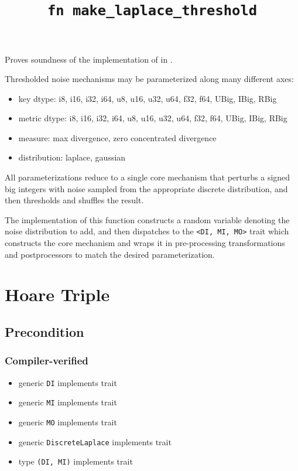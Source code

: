 \documentclass{article}
\title{\texttt{fn make\_laplace\_threshold}}
\author{\MichaelShoemateAuthor}
\date{}
\begin{document}
\maketitle

\contrib
Proves soundness of the implementation of  in .

Thresholded noise mechanisms may be parameterized along many different axes:
\begin{itemize}
    \item key dtype: i8, i16, i32, i64, u8, u16, u32, u64, f32, f64, UBig, IBig, RBig
    \item metric dtype: i8, i16, i32, i64, u8, u16, u32, u64, f32, f64, UBig, IBig, RBig
    \item measure: max divergence, zero concentrated divergence
    \item distribution: laplace, gaussian
\end{itemize}

All parameterizations reduce to a single core mechanism that perturbs
a signed big integers with noise sampled from the appropriate discrete distribution,
and then thresholds and shuffles the result.

The implementation of this function constructs a random variable denoting the noise distribution to add,
and then dispatches to the \texttt{<DI, MI, MO>} trait
which constructs the core mechanism and wraps it in pre-processing transformations and postprocessors to match the desired parameterization.

\section{Hoare Triple}
\subsection*{Precondition}
\subsubsection*{Compiler-verified}
\begin{itemize}
    \item generic \texttt{DI} implements trait 
    \item generic \texttt{MI} implements trait 
    \item generic \texttt{MO} implements trait 
    \item generic \texttt{DiscreteLaplace} implements trait 
    \item type \texttt{(DI, MI)} implements trait 
\end{itemize}
\end{document}
